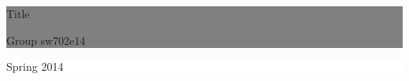 %
%
%
%
	\thispagestyle{empty}

	\vspace*{\fill}

	\noindent \colorbox{gray}{
		\parbox{\textwidth}{%
			\color{white}%
			\begin{center}
				\Huge{{\selectfont Title}} %
			\end{center}
			\begin{center}
			\Large{\textsf{Group sw702e14}}\\
			[0.5cm] %
			\small{
			}
			\end{center}
		}}
		
	\vfill


	\begin{figure}[htbp]
	\centering
	\vspace{140px}
	\end{figure}
	
	\noindent \colorbox{white}{
		\begin{minipage}[b]{6.5cm}
		\begin{center}
			\end{center}
			\vspace*{-20px}
		\end{minipage}
	} 
	\hfill  
	\colorbox{white}{ 
		\begin{minipage}[b]{3.5cm}	 
			\flushright
			{\large Spring 2014} \\
		\end{minipage}
	}

\clearpage
